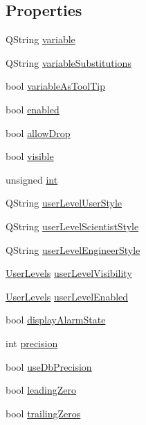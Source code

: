 \subsection*{Properties}
\begin{DoxyCompactItemize}
\item 
QString \hyperlink{classQELabel_a3ca3590d22697395ec79c29335987ed3}{variable}
\item 
QString \hyperlink{classQELabel_aeece637752023b268141770905bd3fa4}{variableSubstitutions}
\item 
bool \hyperlink{classQELabel_a2729739c10c45d2c5462815dd32b194e}{variableAsToolTip}
\item 
bool \hyperlink{classQELabel_aeb323a7764411d7e2d3621eacb975211}{enabled}
\item 
bool \hyperlink{classQELabel_ac0b536527dad1f83436417721add3032}{allowDrop}
\item 
bool \hyperlink{classQELabel_a76bf104bc1f839b9b6a9249931f3f023}{visible}
\item 
unsigned \hyperlink{classQELabel_ad1718c5b99720e4aae40bacad02954c1}{int}
\item 
QString \hyperlink{classQELabel_a3838985f30193aca5ebbcf95d1568a02}{userLevelUserStyle}
\item 
QString \hyperlink{classQELabel_a0db32f7f413a0f90922bf905457e84ff}{userLevelScientistStyle}
\item 
QString \hyperlink{classQELabel_af1b1e6b046a6aca87083ba33a1ee4adf}{userLevelEngineerStyle}
\item 
\hyperlink{classQELabel_ada938d547e11d1ca32786d8bb913ca8a}{UserLevels} \hyperlink{classQELabel_a8e553fceee2d1bcb5b2e6fbacbc100d6}{userLevelVisibility}
\item 
\hyperlink{classQELabel_ada938d547e11d1ca32786d8bb913ca8a}{UserLevels} \hyperlink{classQELabel_aecfbc76bbf4cfdf829d5f3c25395a61c}{userLevelEnabled}
\item 
bool \hyperlink{classQELabel_ac25e8c10f2017824c1995ffee7fa363c}{displayAlarmState}
\item 
int \hyperlink{classQELabel_ae2c883aef3dc155fe5d7b9738196b407}{precision}
\item 
bool \hyperlink{classQELabel_adcb309f27891b269748544992008af59}{useDbPrecision}
\item 
bool \hyperlink{classQELabel_ab81959e3e708ca9e8be50e3b1e6a43e5}{leadingZero}
\item 
bool \hyperlink{classQELabel_a7f1da93667a65a3a3f72ca0bd15449f5}{trailingZeros}
\item 

\end{DoxyCompactItemize}
